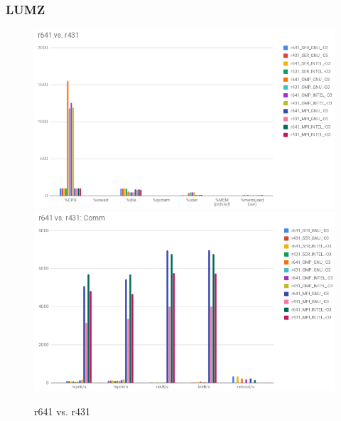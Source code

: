 \documentclass{article}
\begin{document}
\begin{appendices}
\subsubsection{LUMZ}
\begin{figure}[H]
    \centering
    \includegraphics[width=12cm]{Pictures/LUMZ_r641_r431_Comp.png}
    \includegraphics[width=12cm]{Pictures/LUMZ_r641_r431_Comm.png}
    \caption{r641 vs. r431}
    \label{fig:LUMZ_r641_r431}
\end{figure}



\end{appendices}
\end{document}
